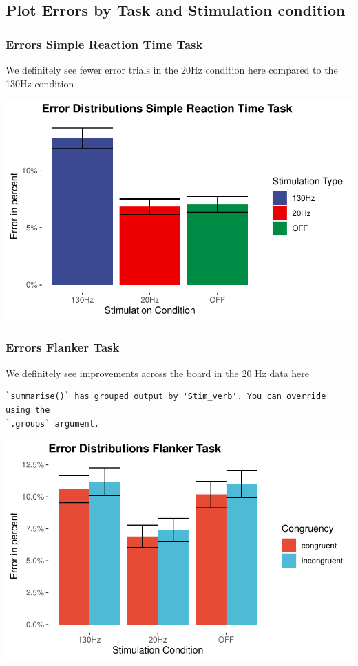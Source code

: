 \documentclass[
  letterpaper,
  DIV=11,
  numbers=noendperiod]{scrartcl}
\begin{document}
\hypertarget{plot-errors-by-task-and-stimulation-condition}{%
\subsection{Plot Errors by Task and Stimulation
condition}\label{plot-errors-by-task-and-stimulation-condition}}

\hypertarget{errors-simple-reaction-time-task}{%
\subsubsection{Errors Simple Reaction Time
Task}\label{errors-simple-reaction-time-task}}

We definitely see fewer error trials in the 20Hz condition here compared
to the 130Hz condition

\includegraphics{MF_01_Modelfree_Analysis_files/figure-pdf/unnamed-chunk-7-1.pdf}

\hypertarget{errors-flanker-task}{%
\subsubsection{Errors Flanker Task}\label{errors-flanker-task}}

We definitely see improvements across the board in the 20 Hz data here

\begin{verbatim}
`summarise()` has grouped output by 'Stim_verb'. You can override using the
`.groups` argument.
\end{verbatim}

\includegraphics{MF_01_Modelfree_Analysis_files/figure-pdf/unnamed-chunk-8-1.pdf}
\end{document}
